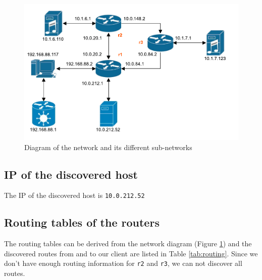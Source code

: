 \documentclass[parskip=full]{scrartcl}
\begin{document}
\begin{figure}[ht]
    \centering
    \includegraphics[width=\textwidth]{network_layout.pdf} 
    \caption{Diagram of the network and its different sub-networks}
    \label{fig:networkLayout}
\end{figure}

\subsection{IP of the discovered host}
The IP of the discovered host is \texttt{10.0.212.52}

\subsection{Routing tables of the routers}
The routing tables can be derived from the network diagram (Figure \ref{fig:networkLayout}) and the discovered routes from and to our client are listed in Table \ref{tab:routing}.
Since we don't have enough routing information for \texttt{r2} and \texttt{r3}, we can not discover all routes.
\end{document}
